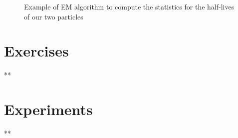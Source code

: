 \documentclass[11pt]{article}
\begin{document}
\begin{itemize}
\begin{itemize}
\begin{figure}[htbp]
\caption{Example of EM algorithm to compute the statistics for the half-lives of our two particles \label{fig:mog}}
\end{figure}
\end{itemize}
\end{itemize}

\section{Exercises}
\label{sec:orga759d75}

**

\section{Experiments}
\label{sec:orgcb61389}

**
\end{document}
